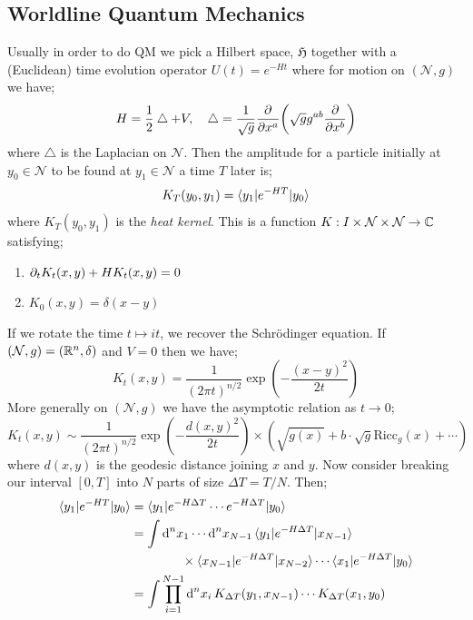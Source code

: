 \subsection{Worldline Quantum Mechanics}
Usually in order to do QM we pick a Hilbert space, $\mathfrak{H}$ together with a (Euclidean) time evolution operator $U(t) = e^{-Ht}$ where for motion on $(\mathcal{N}, g)$ we have;
\begin{equation*}
H = \frac{1}{2}\bigtriangleup + V, \quad \bigtriangleup = \frac{1}{\sqrt{g}}\frac{\del}{\del x^a}\left(\sqrt{g}g^{ab}\frac{\del}{\del x^b}\right)
\end{equation*}
where $\bigtriangleup$ is the Laplacian on $\mathcal{N}$. Then the amplitude for a particle initially at $y_0 \in \mathcal{N}$ to be found at $y_1 \in \mathcal{N}$ a time $T$ later is;
\begin{equation}
K_{T}(y_0, y_1) = \bra{y_1}e^{-HT}\ket{y_0}
\end{equation}
where $K_T(y_0, y_1)$ is the \emph{heat kernel}. This is a function $K : I \times \mathcal{N}\times \mathcal{N} \rightarrow \mathbb{C}$ satisfying;
\begin{enumerate}
\item $\partial_t K_t(x, y) + HK_t(x, y) = 0$
\item $K_0(x, y) = \delta(x - y)$
\end{enumerate}
If we rotate the time $t \mapsto it$, we recover the Schr{\"o}dinger equation. If $(\mathcal{N}, g) = (\mathbb{R}^{n}, \delta)$ and $V = 0$ then we have;
\begin{equation}
K_t(x, y) = \frac{1}{(2\pi t)^{n/2}}\exp\left(-\frac{(x - y)^2}{2t}\right)
\end{equation}
More generally on $(\mathcal{N}, g)$ we have the asymptotic relation as $t \rightarrow 0$;
\begin{equation}
K_t(x, y) \sim \frac{1}{(2 \pi t)^{n/2}}\exp\left(-\frac{d(x, y)^2}{2t}\right)\times\left(\sqrt{g(x)} + b\cdot\sqrt{g}\text{Ricc}_g(x) + \cdots\right)
\end{equation}
where $d(x, y)$ is the geodesic distance joining $x$ and $y$. Now consider breaking our interval $[0, T]$ into $N$ parts of size $\Delta T = T / N$. Then;
\begin{align*}
\bra{y_1}e^{-HT}\ket{y_0} &= \bra{y_1}e^{-H\Delta T}\cdots e^{-H\Delta T}\ket{y_0} \\
&= \int{\ud^n x_1 \cdots \upd{^n x_{N - 1}}\bra{y_1}e^{-H\Delta T}\ket{x_{N - 1}}} \\
&\qquad \qquad \times \bra{x_{N - 1}}e^{-H\Delta T}\ket{x_{N - 2}}\cdots \bra{x_1}e^{-H\Delta T}\ket{y_0} \\
&= \int{\prod_{i = 1}^{N - 1}{\upd{^n x_i}}K_{\Delta T}(y_1, x_{N - 1})\cdots K_{\Delta T}(x_1, y_0)}
\end{align*}
